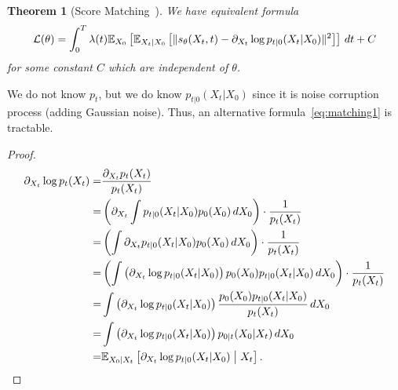 \documentclass[11pt]{article}
\newtheorem{theorem}{Theorem}
\begin{document}
\begin{theorem}[Score Matching~\cite{vincent2011connection}]
    We have equivalent formula
    \begin{align}
        {\cal L}(\theta) = \int_0^T \lambda(t) \mathbb{E}_{X_0}\left[\mathbb{E}_{X_t|X_0}\left[ \| s_\theta(X_t, t)  - \partial_{X_t} \log p_{t|0}(X_t|X_0)\|^2 \right]\right]\, dt + C
        \label{eq:matching1}
    \end{align}
    for some constant $C$ which are independent of $\theta$.
\end{theorem}
We do not know $p_t$, but we do know $p_{t|0}(X_t|X_0)$ since it is noise corruption process (adding Gaussian noise).
Thus, an alternative formula~\eqref{eq:matching1} is tractable.

\begin{proof}
    \begin{align}
        \partial_{X_t} \log p_t (X_t) 
        =&  \frac{\partial_{X_t} p_t(X_t)}{p_t(X_t)}\\
        =&  \left(\partial_{X_t} \int p_{t|0}(X_t|X_0)p_0(X_0) \, dX_0 \right)\cdot \frac{1}{p_t(X_t)} \\
        =&  \left(\int\partial_{X_t}  p_{t|0}(X_t|X_0)p_0(X_0) \, dX_0 \right)\cdot \frac{1}{p_t(X_t)} \\
        =&  \left(\int\left(\partial_{X_t}  \log p_{t|0}(X_t|X_0)\right)p_0(X_0)p_{t|0}(X_t|X_0) \, dX_0 \right)\cdot \frac{1}{p_t(X_t)} \\
        =&  \int\left(\partial_{X_t}  \log p_{t|0}(X_t|X_0)\right)\frac{p_0(X_0)p_{t|0}(X_t|X_0)}{p_t(X_t)} \, dX_0  \\
        =&  \int\left(\partial_{X_t}  \log p_{t|0}(X_t|X_0)\right)p_{0|t}(X_0|X_t) \, dX_0  \\
        =&  \fE_{X_0|X_t}\left[\partial_{X_t}  \log p_{t|0}(X_t|X_0)\suchthat X_t\right].
    \end{align}


\end{proof}
\end{document}
